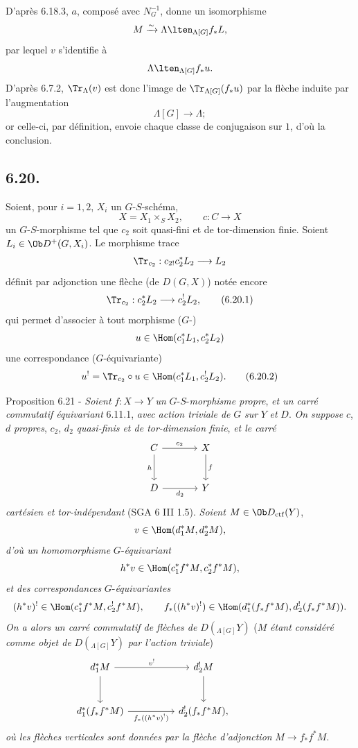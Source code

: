 D'après 6.18.3, $a$,
composé avec $N_G^{-1}$, donne un isomorphisme
\[
M\xrightarrow{\sim}\Lambda\lten_{\Lambda[G]}f_*L,
\]
par lequel $v$ s'identifie à
\[
\Lambda\lten_{\Lambda[G]}f_*u.
\]
D'après 6.7.2, $\Tr_{\Lambda}(v)$ est donc l'image de $\Tr_{\Lambda[G]}(f_*u)$ par la flèche induite par l'augmentation
\[
\Lambda[G]\longrightarrow \Lambda;
\]
or celle-ci, par définition, envoie chaque classe de conjugaison sur $1$, d'où la conclusion.

\subsection*{6.20.}
Soient, pour $i=1,2$, $X_i$ un $G$-$S$-schéma,
\[
X=X_1\times_SX_2,\qquad c:C\to X
\]
un $G$-$S$-morphisme tel que $c_2$ soit quasi-fini et de tor-dimension finie. Soient $L_i\in\Ob D^+(G,X_i)$. Le morphisme trace
\[
\Tr_{c_2}:c_{2!}c_2^*L_2\longrightarrow L_2
\]
définit par adjonction une flèche (de $D(G,X)$) notée encore
\begin{equation}
\Tr_{c_2}:c_2^*L_2\longrightarrow c_2^!L_2,
\tag{6.20.1}
\end{equation}
qui permet d'associer à tout morphisme ($G$-)
\[
u\in\Hom(c_1^*L_1,c_2^*L_2)
\]
une correspondance ($G$-équivariante)
\begin{equation}
u^! = \Tr_{c_2}\circ u\in\Hom(c_1^*L_1,c_2^!L_2).
\tag{6.20.2}
\end{equation}

\begin{statement}{Proposition 6.21 -}
\emph{Soient} $f:X\to Y$ \emph{un} $G$-$S$-\emph{morphisme propre}, \emph{et un carré commutatif équivariant} 6.11.1, \emph{avec action triviale de} $G$ \emph{sur} $Y$ \emph{et} $D$. \emph{On suppose} $c$, $d$ \emph{propres}, $c_2$, $d_2$ \emph{quasi-finis et de tor-dimension finie}, \emph{et le carré}
\[
\begin{tikzcd}[column sep=large,row sep=large]
C \arrow[r,"c_2"] \arrow[d,"h"'] & X \arrow[d,"f"]\\
D \arrow[r,"d_2"'] & Y
\end{tikzcd}
\]
\emph{cartésien et tor-indépendant} (SGA 6 III 1.5). \emph{Soient} $M\in\Ob D_{\mathrm{ctf}}(Y)$,
\[
v\in\Hom(d_1^*M,d_2^*M),
\]
\emph{d'où un homomorphisme} $G$-\emph{équivariant}
\[
h^*v\in\Hom(c_1^*f^*M,c_2^*f^*M),
\]
\emph{et des correspondances} $G$-\emph{équivariantes}
\[
(h^*v)^!\in\Hom(c_1^*f^*M,c_2^!f^*M),
\qquad
f_*((h^*v)^!)\in\Hom(d_1^*(f_*f^*M),d_2^!(f_*f^*M)).
\]
\emph{On a alors un carré commutatif de flèches de} $D({}_{\Lambda[G]}Y)$ ($M$ \emph{étant considéré comme objet de} $D({}_{\Lambda[G]}Y)$ \emph{par l'action triviale})
\[
\begin{tikzcd}[column sep=huge,row sep=large]
d_1^*M \arrow[r,"v^!"] \arrow[d] & d_2^!M \arrow[d] & {}\\
d_1^*(f_*f^*M) \arrow[r,"f_*((h^*v)^!)"'] & d_2^!(f_*f^*M),
\end{tikzcd}
\]
\emph{où les
flèches verticales sont données par la flèche d'adjonction} $M\to f_*f^*M$.
\end{statement}

